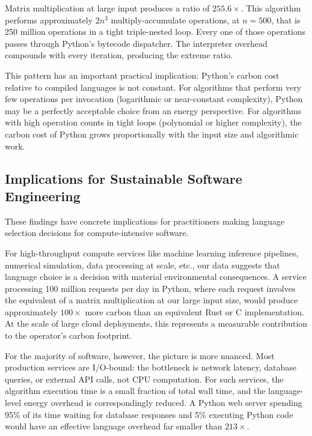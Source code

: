 Matrix multiplication at large input produces a ratio of $255.6\times$. This algorithm performs approximately $2n^3$ multiply-accumulate operations, at $n = 500$, that is 250 million operations in a tight triple-nested loop. Every one of those operations passes through Python's bytecode dispatcher. The interpreter overhead compounds with every iteration, producing the extreme ratio.
 
This pattern has an important practical implication: Python's carbon cost relative to compiled languages is not constant. For algorithms that perform very few operations per invocation (logarithmic or near-constant complexity), Python may be a perfectly acceptable choice from an energy perspective. For algorithms with high operation counts in tight loops (polynomial or higher complexity), the carbon cost of Python grows proportionally with the input size and algorithmic work.
 





\subsection{Implications for Sustainable Software Engineering}
 
These findings have concrete implications for practitioners making language selection decisions for compute-intensive software.
 
For high-throughput compute services like machine learning inference pipelines, numerical simulation, data processing at scale, etc., our data suggests that language choice is a decision with material environmental consequences. A service processing 100 million requests per day in Python, where each request involves the equivalent of a matrix multiplication at our large input size, would produce approximately $100\times$ more carbon than an equivalent Rust or C implementation. At the scale of large cloud deployments, this represents a measurable contribution to the operator's carbon footprint.
 
For the majority of software, however, the picture is more nuanced. Most production services are I/O-bound: the bottleneck is network latency, database queries, or external API calls, not CPU computation. For such services, the algorithm execution time is a small fraction of total wall time, and the language-level energy overhead is correspondingly reduced. A Python web server spending 95\% of its time waiting for database responses and 5\% executing Python code would have an effective language overhead far smaller than $213\times$.
 
